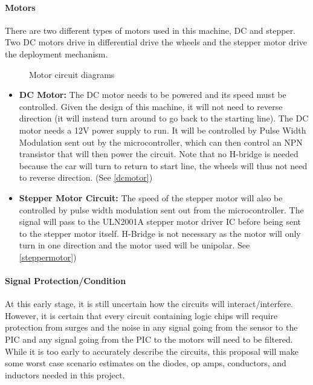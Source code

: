 \documentclass[11pt]{report}
\begin{document}
\paragraph{Motors}
There are two different types of motors used in this machine, DC and stepper. Two DC motors drive in differential drive the wheels and the stepper motor drive the deployment mechanism.
\begin{figure}[h!]
  \centering
  \subfloat[DC Motor]{\label{dcmotor}\texttt{[image: dc]}}  
\hspace{20pt}             
  \caption{Motor circuit diagrams}
\end{figure}
\begin{itemize}
\item{\textbf{DC Motor:}
The DC motor needs to be powered and its speed must be controlled. Given the design of this machine, it will not need to reverse direction (it will instead turn around to go back to the starting line). The DC motor needs a 12V power supply to run. It will be controlled by Pulse Width Modulation sent out by the microcontroller, which can then control an NPN transistor that will then power the circuit. Note that no H-bridge is needed because the car will turn to return to start line, the wheels will thus not need to reverse direction. (See \ref{dcmotor})}
\item{\textbf{Stepper Motor Circuit:}
The speed of the stepper motor will also be controlled by pulse width modulation sent out from the microcontroller. The signal will pass to the ULN2001A stepper motor driver IC before being sent to the stepper motor itself. H-Bridge is not necessary as the motor will only turn in one direction and the motor used will be unipolar. See \ref{steppermotor})}
\end{itemize}
\paragraph{Signal Protection/Condition}
At this early stage, it is still uncertain how the circuits will interact/interfere. However, it is certain that every circuit containing logic chips will require protection from surges and the noise in any signal going from the sensor to the PIC and any signal going from the PIC to the motors will need to be filtered. While it is too early to accurately describe the circuits, this proposal will make some worst case scenario estimates on the diodes, op amps, conductors, and inductors needed in this project.
\end{document}
